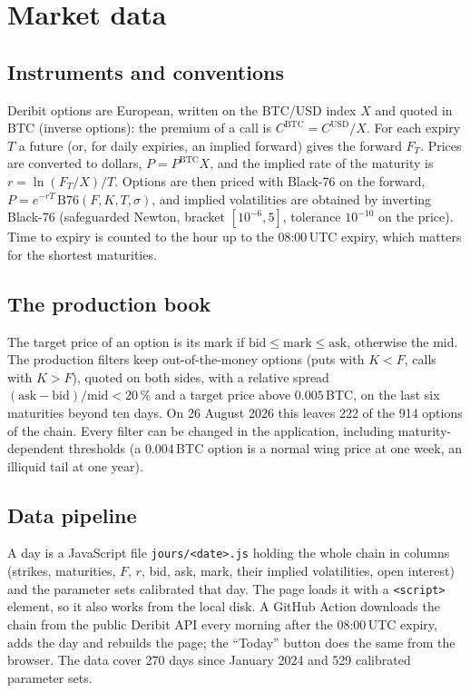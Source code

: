 \documentclass[11pt,a4paper]{article}
\theoremstyle{definition}
\theoremstyle{remark}
\begin{document}
\section{Market data}\label{sec:data}
\subsection{Instruments and conventions}
Deribit options are European, written on the BTC/USD index $X$ and quoted in BTC (inverse options): the premium of a call is
$C^{\mathrm{BTC}}=C^{\mathrm{USD}}/X$. For each expiry $T$ a future (or, for daily expiries, an implied forward) gives the
forward $F_T$. Prices are converted to dollars, $P=P^{\mathrm{BTC}}X$, and the implied rate of the maturity is
$r=\ln(F_T/X)/T$. Options are then priced with Black-76 on the forward, $P=e^{-rT}\,\mathrm{B76}(F,K,T,\sigma)$, and implied
volatilities are obtained by inverting Black-76 (safeguarded Newton, bracket $[10^{-6},5]$, tolerance $10^{-10}$ on the price).
Time to expiry is counted to the hour up to the 08:00\,UTC expiry, which matters for the shortest maturities.

\subsection{The production book}
The target price of an option is its mark if $\mathrm{bid}\le\mathrm{mark}\le\mathrm{ask}$, otherwise the mid. The production
filters keep out-of-the-money options (puts with $K<F$, calls with $K>F$), quoted on both sides, with a relative spread
$(\mathrm{ask}-\mathrm{bid})/\mathrm{mid}<20\,\%$ and a target price above $0.005$\,BTC, on the last six maturities beyond ten days.
On 26 August 2026 this leaves 222 of the 914 options of the chain. Every filter can be changed in the application, including
maturity-dependent thresholds (a $0.004$\,BTC option is a normal wing price at one week, an illiquid tail at one year).

\subsection{Data pipeline}
A day is a JavaScript file \texttt{jours/<date>.js} holding the whole chain in columns (strikes, maturities, $F$, $r$, bid,
ask, mark, their implied volatilities, open interest) and the parameter sets calibrated that day. The page loads it with a
\texttt{<script>} element, so it also works from the local disk. A GitHub Action downloads the chain from the public Deribit API
every morning after the 08:00\,UTC expiry, adds the day and rebuilds the page; the ``Today'' button does the same from the
browser. The data cover 270 days since January 2024 and 529 calibrated parameter sets.
\end{document}
